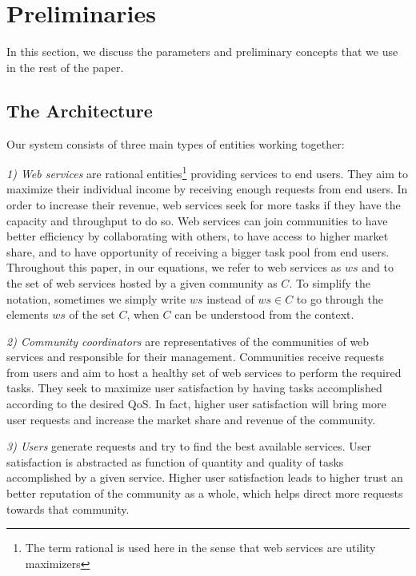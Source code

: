 \documentclass[10pt,journal,cspaper,compsoc]{IEEEtran}
\begin{document}



\section{Preliminaries}\label{s:preliminaries}

In this section, we discuss the parameters and preliminary
concepts that we use in the rest of the paper.

\subsection{The Architecture}

Our system consists of three main types of entities working
together:

\emph{1) Web services} are rational entities\footnote{The term
rational is used here in the sense that web services are utility
maximizers} providing services to end users. They aim to maximize
their individual income by receiving enough requests from end
users. In order to increase their revenue, web services seek for
more tasks if they have the capacity and throughput to do so. Web
services can join communities to have better efficiency by
collaborating with others, to have access to higher market share,
and to have opportunity of receiving a bigger task pool from end
users. Throughout this paper, in our equations, we refer to web
services as $ws$ and to the set of web services hosted by a given
community as $C$. To simplify the notation, sometimes we simply
write $ws$ instead of $ws \in C$ to go through the elements $ws$
of the set $C$, when $C$ can be understood from the context.

\emph{2) Community coordinators} are
representatives of the communities of web services and responsible
for their management. Communities receive requests from users and
aim to host a healthy set of web services to perform the required
tasks. They seek to maximize user satisfaction by having tasks
accomplished according to the desired QoS. In fact, higher user
satisfaction will bring more user requests and increase the market
share and revenue of the community.

\emph{3) Users} generate requests and try to find the best
available services. User satisfaction is abstracted as function of
quantity and quality of tasks accomplished by a given service.
Higher user satisfaction leads to higher trust an better
reputation of the community as a whole, which helps direct more
requests towards that community.
\end{document}
